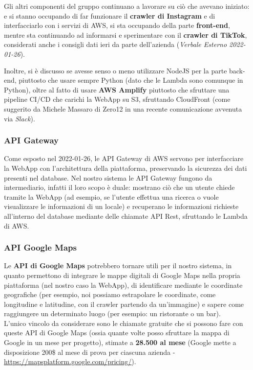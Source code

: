 Gli altri componenti del gruppo continuano a lavorare su ciò che avevano iniziato: \FP{} e \MB{} si stanno occupando di far funzionare il \textbf{crawler di Instagram} e di interfacciarlo con i servizi di AWS, \GC{} si sta occupando della parte \textbf{front-end}, mentre \MG{} sta continuando ad informarsi e sperimentare con il \textbf{crawler di TikTok}, considerati anche i consigli dati ieri da parte dell'azienda (\textit{Verbale Esterno 2022-01-26}).

Inoltre, si è discusso se avesse senso o meno utilizzare NodeJS per la parte back-end, piuttosto che usare sempre Python (dato che le Lambda sono comunque in Python), oltre al fatto di usare \textbf{AWS Amplify} piuttosto che sfruttare una pipeline CI/CD che carichi la WebApp su S3, sfruttando CloudFront (come suggerito da Michele Massaro di Zero12 in una recente comunicazione avvenuta via \textit{Slack}).

\subsubsection{API Gateway}

Come esposto nel \Ve{} 2022-01-26, le API Gateway di AWS servono per interfacciare la WebApp con l'architettura della piattaforma, preservando la sicurezza dei dati presenti nel database. Nel nostro sistema le API Gateway fungono da intermediario, infatti il loro scopo è duale: mostrano ciò che un utente chiede tramite la WebApp (ad esempio, se l'utente effettua una ricerca o vuole visualizzare le informazioni di un locale) e recuperano le informazioni richieste all'interno del database mediante delle chiamate API Rest, sfruttando le Lambda di AWS.

\subsubsection{API Google Maps}
 
Le \textbf{API di Google Maps} potrebbero tornare utili per il nostro sistema, in quanto permettono di integrare le mappe digitali di Google Maps nella propria piattaforma (nel nostro caso la WebApp), di identificare mediante le coordinate geografiche (per esempio, noi possiamo estrapolare le coordinate, come longitudine e latitudine, con il crawler partendo da un'immagine) e sapere come raggiungere un determinato luogo (per esempio: un ristorante o un bar). \\
L'unico vincolo da considerare sono le chiamate gratuite che si possono fare con queste API di Google Maps (ossia quante volte posso sfruttare la mappa di Google in un mese per progetto), stimate a \textbf{28.500 al mese} (Google mette a disposizione 200\$ al mese di prova per ciascuna azienda - \color{blue}  \underline{\url{https://mapsplatform.google.com/pricing/}}\color{black}).  

